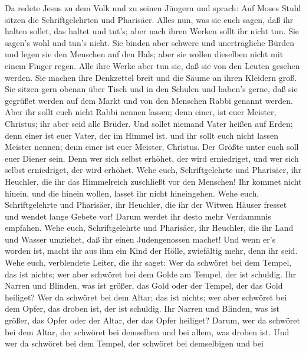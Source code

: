  Da redete Jesus zu dem Volk und zu seinen Jüngern
 und sprach: Auf Moses Stuhl sitzen die Schriftgelehrten und
Pharisäer.  Alles nun, was sie euch sagen, daß ihr halten
sollet, das haltet und tut's; aber nach ihren Werken sollt ihr nicht
tun. Sie sagen's wohl und tun's nicht.  Sie binden aber
schwere und unerträgliche Bürden und legen sie den Menschen auf den
Hals; aber sie wollen dieselben nicht mit einem Finger regen.
 Alle ihre Werke aber tun sie, daß sie von den Leuten
gesehen werden. Sie machen ihre Denkzettel breit und die Säume an ihren
Kleidern groß.  Sie sitzen gern obenan über Tisch und in den
Schulen  und haben's gerne, daß sie gegrüßet werden auf dem
Markt und von den Menschen Rabbi genannt werden.  Aber ihr
sollt euch nicht Rabbi nennen lassen; denn einer, ist euer Meister,
Christus; ihr aber seid alle Brüder.  Und sollet niemand
Vater heißen auf Erden; denn einer ist euer Vater, der im Himmel ist.
 und ihr sollt euch nicht lassen Meister nennen; denn einer
ist euer Meister, Christus.  Der Größte unter euch soll
euer Diener sein.  Denn wer sich selbst erhöhet, der wird
erniedriget, und wer sich selbst erniedriget, der wird erhöhet.
 Wehe euch, Schriftgelehrte und Pharisäer, ihr Heuchler,
die ihr das Himmelreich zuschließt vor den Menschen! Ihr kommet nicht
hinein, und die hinein wollen, lasset ihr nicht hineingehen.
 Wehe euch, Schriftgelehrte und Pharisäer, ihr Heuchler,
die ihr der Witwen Häuser fresset und wendet lange Gebete vor! Darum
werdet ihr desto mehr Verdammnis empfahen.  Wehe euch,
Schriftgelehrte und Pharisäer, ihr Heuchler, die ihr Land und Wasser
umziehet, daß ihr einen Judengenossen machet! Und wenn er's worden ist,
macht ihr aus ihm ein Kind der Hölle, zwiefältig mehr, denn ihr seid.
 Wehe euch, verblendete Leiter, die ihr saget: Wer da
schwöret bei dem Tempel, das ist nichts; wer aber schwöret bei dem Golde
am Tempel, der ist schuldig.  Ihr Narren und Blinden, was
ist größer, das Gold oder der Tempel, der das Gold heiliget?
 Wer da schwöret bei dem Altar; das ist nichts; wer aber
schwöret bei dem Opfer, das droben ist, der ist schuldig. 
Ihr Narren und Blinden, was ist größer, das Opfer oder der Altar, der
das Opfer heiliget?  Darum, wer da schwöret bei dem Altar,
der schwöret bei demselben und bei allem, was droben ist. 
Und wer da schwöret bei dem Tempel, der schwöret bei demselbigen und bei
